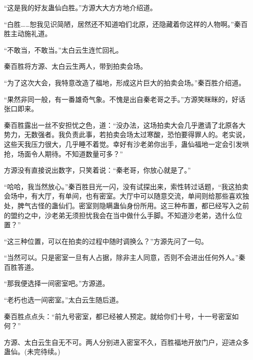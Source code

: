 \begin{this_body}
“这是我的好友蛊仙白胜。”方源大大方方地介绍道。

“白胜……恕我见识简陋，居然还不知道咱们北原，还隐藏着你这样的人物啊。”秦百胜主动施礼道。

“不敢当，不敢当。”太白云生连忙回礼。

秦百胜将方源、太白云生两人，带到拍卖会场。

“为了这次大会，我特意改造了福地，形成这片巨大的拍卖会场。”秦百胜介绍道。

“果然非同一般，有一番雄奇气象。不愧是出自秦老哥之手。”方源笑眯眯的，好话张口即来。

秦百胜露出一丝不安担忧之色，道：“没办法，这场拍卖大会几乎邀请了北原各大势力，无数强者。我负责此事，若拍卖会场太过寒酸，恐怕要得罪人的。老实说，这些天我压力很大，几乎睡不着觉。幸好有沙老弟你出手，蛊仙福地一定会引发哄抢，场面令人期待。不知道数量可多？”

方源没有直接说出数字，只笑着说：“秦老哥，你放心就是了。”

“哈哈，我当然放心。”秦百胜目光一闪，没有试探出来，索性转过话题，“我这拍卖会场中，有大厅，有单间，也有密室。大厅中可以随意交流，单间则给那些喜欢独处，脾气古怪的蛊仙们。密室则隐瞒蛊仙身份所用。这三种布置，都已经写入之前的盟约之中，沙老弟无须担忧我会在当中做什么手脚。不知道沙老弟，选什么位置？”

“这三种位置，可以在拍卖的过程中随时调换么？”方源先问了一句。

“当然可以。只是密室一旦有人占据，除非主人同意，否则不会进出任何外人。”秦百胜答道。

“那我便选择一间密室吧。”方源道。

“老朽也选一间密室。”太白云生随后道。

秦百胜点点头：“前九号密室，都已经被人预定。就给你们十号，十一号密室如何？”

方源、太白云生自无不可。两人分别进入密室不久，百胜福地开放门户，迎进众多蛊仙。(未完待续。)

\end{this_body}

